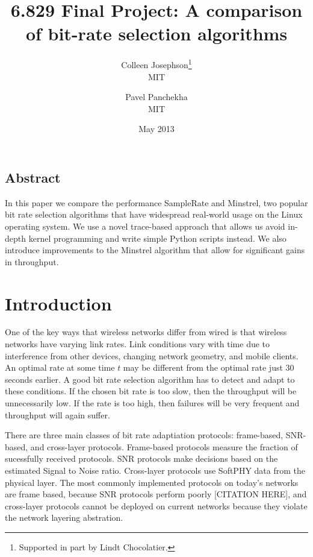 \documentclass[letterpaper,twocolumn,10pt]{article}
\begin{document}
\date{May 2013}

\title{\Large \bf 6.829 Final Project: A comparison of bit-rate selection algorithms}
\author{
{\rm Colleen Josephson\footnote{Supported in part by Lindt Chocolatier.}}\\
MIT
\and
{\rm Pavel Panchekha}\\
MIT
} %

\maketitle


\subsection*{Abstract}
In this paper we compare the performance SampleRate and Minstrel, two popular bit rate selection algorithms that have widespread real-world usage on the Linux operating system. We use a novel trace-based approach that allows us avoid in-depth kernel programming and write simple Python scripts instead. We also introduce improvements to the Minstrel algorithm that allow for significant gains in throughput. 
\section{Introduction}

One of the key ways that wireless networks differ from wired is that wireless networks have varying link rates. Link conditions vary with time due to interference from other devices, changing network geometry, and mobile clients. An optimal rate at some time $t$ may be different from the optimal rate just 30 seconds earlier. A good bit rate selection algorithm has to detect and adapt to these conditions. If the chosen bit rate is too slow, then the throughput will be unnecessarily low. If the rate is too high, then failures will be very frequent and throughput will again suffer. 

There are three main classes of bit rate adaptiation protocols: frame-based, SNR-based, and cross-layer protocols. Frame-based protocols measure the fraction of sucessfully received protocols. SNR protocols make decisions based on the estimated Signal to Noise ratio. Cross-layer protocols use SoftPHY data from the physical layer. The most commonly implemented protocols on today's networks are frame based, because SNR protocols perform poorly [CITATION HERE], and cross-layer protocols cannot be deployed on current networks because they violate the network layering abstration. 
\end{document}
